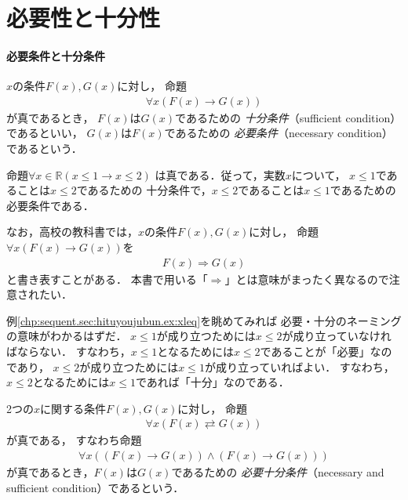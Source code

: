  \section{必要性と十分性}
 \label{sec:hituyoujubun}

 \paragraph{必要条件と十分条件}
 
 $x$の条件$F(x),  G(x)$に対し，
 命題
 \begin{align}
   \forall x ( F(x) \to G(x))
   \label{eq:FnarabaG}
 \end{align}  
 が真であるとき，
 $F(x)$は$G(x)$であるための
 \emph{十分条件}（sufficient condition）であるといい，
 $G(x)$は$F(x)$であるための
 \emph{必要条件}（necessary condition）であるという．

 \begin{ex} \label{chp:sequent.sec:hituyoujubun.ex:xleq}
   命題$\forall x \in \mathbb{R} ( x \leq 1 \to x\leq 2)$
   は真である．従って，実数$x$について，
   $x \leq 1$であることは$x \leq 2$であるための
   十分条件で，$x \leq 2$であることは$x \leq 1$であるための
   必要条件である．
 \end{ex}
 なお，高校の教科書では，$x$の条件$F(x),  G(x)$に対し，
 命題$\forall x (F(x) \to G(x) )$を
 \begin{align}
   F(x) \Longrightarrow G(x)
   \label{eq:narabakoukou}
 \end{align}
 と書き表すことがある．
 本書で用いる「$\Longrightarrow$」とは意味がまったく異なるので注意されたい．

 例\ref{chp:sequent.sec:hituyoujubun.ex:xleq}を眺めてみれば
 必要・十分のネーミングの意味がわかるはずだ．
 $x \leq 1$が成り立つためには$x \leq 2$が成り立っていなければならない．
 すなわち，$x \leq 1$となるためには$x \leq 2$であることが「必要」なのであり，
 $x \leq 2$が成り立つためには$x \leq 1$が成り立っていればよい．
 すなわち，$x \leq 2$となるためには$x \leq 1$であれば「十分」なのである．

 2つの$x$に関する条件$F(x),  G(x)$に対し，
 命題
 \begin{align}
   \forall x ( F(x) \rightleftarrows G(x))
   \label{eq:FGdouti}
 \end{align}
 が真である，
 すなわち命題
 \begin{align}
   \forall x( (F(x) \to G(x) ) \land ( F(x) \to G(x) ))
   \label{eq:FGdouti2}
 \end{align}
 が真であるとき，$F(x)$は$G(x)$であるための
 \emph{必要十分条件}（necessary and sufficient condition）であるという．

